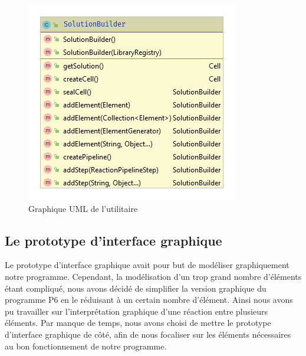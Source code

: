\documentclass[a4paper, 12pt]{article}
\begin{document}
\begin{figure}[!ht]
  \centering
  \includegraphics[scale=0.8]{./img/SolutionBuilder.png}
  \caption{Graphique UML de l'utilitaire}
\end{figure}

\subsection{Le prototype d'interface graphique}
Le prototype d’interface graphique avait pour but de modéliser graphiquement notre programme. Cependant, la modélisation d’un trop grand nombre d’éléments étant compliqué, nous avons décidé de simplifier la version graphique du programme P6 en le réduisant à un certain nombre d’élément.
Ainsi nous avons pu travailler sur l’interprétation graphique d’une réaction entre plusieurs éléments.
Par manque de temps, nous avons choisi de mettre le prototype d’interface graphique de côté, afin de nous focaliser sur les éléments nécessaires au bon fonctionnement de notre programme.
\end{document}
